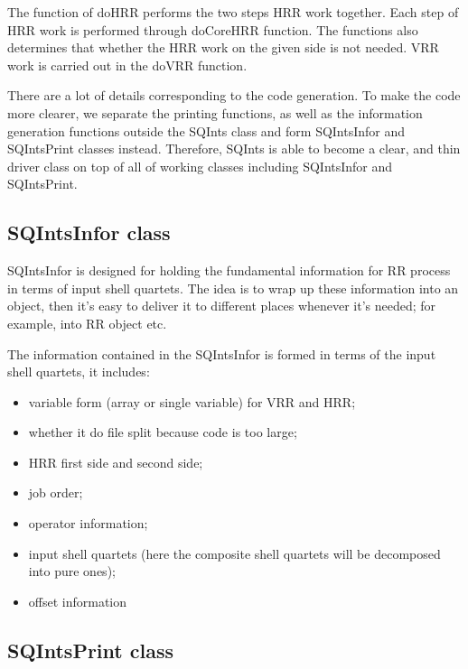 The function of doHRR performs the two steps HRR work together. Each step of HRR 
work is performed through doCoreHRR function. The functions also determines that 
whether the HRR work on the given side is not needed. VRR work is carried out 
in the doVRR function.

There are a lot of details corresponding to the code generation. To make the 
code more clearer, we separate the printing functions, as well as the information
generation functions outside the SQInts class and form SQIntsInfor and SQIntsPrint
classes instead. Therefore, SQInts is able to become a clear, and thin driver
class on top of all of working classes including SQIntsInfor and SQIntsPrint.

\subsection{SQIntsInfor class}

SQIntsInfor is designed for holding the fundamental information for RR process
in terms of input shell quartets. The idea is to wrap up these information into
an object, then it's easy to deliver it to different places whenever it's needed;
for example, into RR object etc.

The information contained in the SQIntsInfor is formed in terms of the input
shell quartets, it includes:
\begin{itemize}
 \item variable form (array or single variable) for VRR and HRR;
 \item whether it do file split because code is too large;
 \item HRR first side and second side;
 \item job order;
 \item operator information;
 \item input shell quartets (here the composite shell quartets will
 be decomposed into pure ones);
 \item  offset information
\end{itemize}


\subsection{SQIntsPrint class}
 
